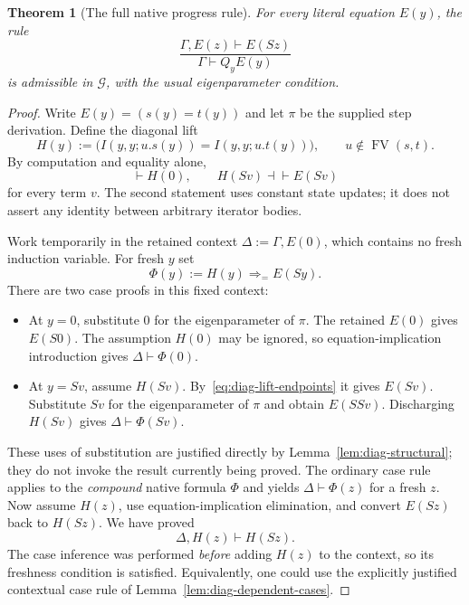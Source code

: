 \documentclass[11pt]{article}
\newtheorem{theorem}{Theorem}[section]
\theoremstyle{definition}
\theoremstyle{remark}
\begin{document}
\begin{theorem}[The full native progress rule]
\label{thm:diag-progress}
For every literal equation $E(y)$, the rule
\[
 \frac{\Gamma,E(z)\vdash E(Sz)}{\Gamma\vdash Q_yE(y)}
\]
is admissible in $\mathcal G$, with the usual eigenparameter condition.
\end{theorem}
\begin{proof}
Write $E(y)=(s(y)=t(y))$ and let $\pi$ be the supplied step derivation.
Define the diagonal lift
\begin{equation}
 H(y):=
 \bigl(I(y,y;u.s(y))=I(y,y;u.t(y))\bigr),
 \qquad u\notin\operatorname{FV}(s,t).
 \label{eq:diag-lift}
\end{equation}
By computation and equality alone,
\begin{equation}
 \vdash H(0),\qquad
 H(Sv)\dashv\vdash E(Sv)
 \label{eq:diag-lift-endpoints}
\end{equation}
for every term $v$.  The second statement uses constant state updates;
it does not assert any identity between arbitrary iterator bodies.

Work temporarily in the retained context
$\Delta:=\Gamma,E(0)$, which contains no fresh induction variable.
For fresh $y$ set
\[
 \Phi(y):=H(y)\Rightarrow_{=}E(Sy).
\]
There are two case proofs in this fixed context:
\begin{itemize}
\item At $y=0$, substitute $0$ for the eigenparameter of $\pi$.
  The retained $E(0)$ gives $E(S0)$.
  The assumption $H(0)$ may be ignored, so equation-implication
  introduction gives $\Delta\vdash\Phi(0)$.
\item At $y=Sv$, assume $H(Sv)$.
  By~\eqref{eq:diag-lift-endpoints} it gives $E(Sv)$.
  Substitute $Sv$ for the eigenparameter of $\pi$ and obtain $E(SSv)$.
  Discharging $H(Sv)$ gives $\Delta\vdash\Phi(Sv)$.
\end{itemize}
These uses of substitution are justified directly by
Lemma~\ref{lem:diag-structural}; they do not invoke the result currently
being proved.
The ordinary case rule applies to the \emph{compound} native formula
$\Phi$ and yields $\Delta\vdash\Phi(z)$ for a fresh $z$.
Now assume $H(z)$, use equation-implication elimination, and convert
$E(Sz)$ back to $H(Sz)$.  We have proved
\[
 \Delta,H(z)\vdash H(Sz).
\]
The case inference was performed \emph{before} adding $H(z)$ to the
context, so its freshness condition is satisfied.  Equivalently, one
could use the explicitly justified contextual case rule of
Lemma~\ref{lem:diag-dependent-cases}.


\end{proof}
\end{document}
